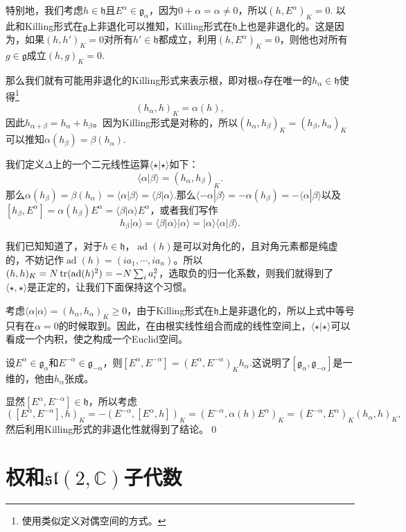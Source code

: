\documentclass[10pt]{article}
\newcommand{\cc}{\mathbb{C}}
\newcommand{\lag}{{\mathfrak{g}}}
\DeclareMathOperator{\ad}{ad}
\begin{document}
\para 特别地，我们考虑$h\in \mathfrak{h}$且$E^\alpha\in \lag_\alpha$，因为$0+\alpha=\alpha\neq 0$，所以$(h,E^\alpha)_K=0$. 以此和Killing形式在$\mathfrak{g}$上非退化可以推知，Killing形式在$\mathfrak{h}$上也是非退化的。这是因为，如果$(h,h')_K=0$对所有$h'\in \mathfrak{h}$都成立，利用$(h,E^\alpha)_K=0$，则他也对所有$g\in \lag$成立$(h,g)_K=0$.

那么我们就有可能用非退化的Killing形式来表示根，即对根$\alpha$存在唯一的$h_\alpha\in\mathfrak{h}$使得\footnote{使用类似定义对偶空间的方式。}
\[
	(h_\alpha,h)_K=\alpha(h),
\]
因此$h_{\alpha+\beta}=h_\alpha+h_\beta$。因为Killing形式是对称的，所以$(h_\alpha,h_\beta)_K=(h_\beta,h_\alpha)_K$可以推知$\alpha(h_\beta)=\beta(h_\alpha)$.

\para 我们定义$\Delta$上的一个二元线性运算$\langle \star|\star \rangle$如下：
\[
	\langle \alpha|\beta \rangle=(h_\alpha,h_\beta)_K.
\]
那么$\alpha(h_\beta)=\beta(h_\alpha)=\langle \alpha|\beta \rangle=\langle \beta|\alpha \rangle$.那么$\langle -\alpha|\beta \rangle=-\alpha(h_\beta)=-\langle \alpha|\beta \rangle$以及$[h_\beta,E^\alpha]=\alpha(h_\beta)E^\alpha=\langle \beta|\alpha \rangle E^\alpha$，或者我们写作
\[
	h_\beta|\alpha\rangle = \langle \beta|\alpha \rangle|\alpha\rangle=|\alpha\rangle \langle \alpha|\beta \rangle.
\]

\para 我们已知知道了，对于$h\in \mathfrak{h}$，$\ad(h)$是可以对角化的，且对角元素都是纯虚的，不妨记作$\ad(h)=(ia_1,\cdots,ia_n)$。所以$(h,h)_K=N\tr(\ad(h)^2)=-N\sum_i a_i^2$，选取负的归一化系数，则我们就得到了$\langle \star,\star \rangle$是正定的，让我们下面保持这个习惯。

考虑$\langle \alpha|\alpha\rangle = (h_\alpha,h_\alpha)_K\geq 0$，由于Killing形式在$\mathfrak{h}$上是非退化的，所以上式中等号只有在$\alpha=0$的时候取到。因此，在由根实线性组合而成的线性空间上，$\langle \star|\star\rangle$可以看成一个内积，使之构成一个Euclid空间。

\pro 设$E^\alpha \in \lag_\alpha$和$E^{-\alpha} \in \lag_{-\alpha}$，则$[E^{\alpha},E^{-\alpha}]=(E^{\alpha},E^{-\alpha})_Kh_\alpha$.这说明了$[\lag_{\alpha},\lag_{-\alpha}]$是一维的，他由$h_\alpha$张成。

\proof 显然$[E^\alpha,E^{-\alpha}]\in \mathfrak{h}$，所以考虑
\[
	([E^\alpha,E^{-\alpha}],h)_K=-(E^{-\alpha},[E^\alpha,h])_K=(E^{-\alpha},\alpha(h)E^\alpha)_K=(E^{-\alpha},E^\alpha)_K(h_\alpha,h)_K,
\]
然后利用Killing形式的非退化性就得到了结论。\qed

\section{权和$\mathfrak{sl}(2,\cc)$子代数}
\end{document}
